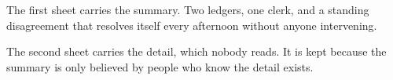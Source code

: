 \documentclass{article}
\begin{document}
The first sheet carries the summary. Two ledgers, one clerk, and a standing
disagreement that resolves itself every afternoon without anyone
intervening.

\newpage

The second sheet carries the detail, which nobody reads. It is kept because
the summary is only believed by people who know the detail exists.
\end{document}
